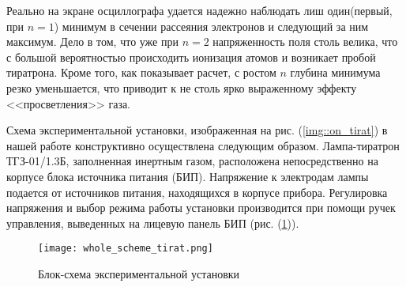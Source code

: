 Реально на экране осциллографа удается надежно наблюдать лиш один(первый, при $n
= 1$) минимум в сечении рассеяния электронов и следующий за ним максимум. Дело в
том, что уже при $n = 2$ напряженность поля столь велика, что с большой
вероятностью происходить ионизация атомов и возникает пробой тиратрона. Кроме
того, как показывает расчет, с ростом $n$ глубина минимума резко уменьшается,
что приводит к не столь ярко выраженному эффекту <<просветления>> газа.

Схема экспериментальной установки, изображенная на рис. (\ref{img::on_tirat}) в
нашей работе конструктивно осуществлена следующим образом. Лампа-тиратрон
ТГЗ-01/1.3Б, заполненная инертным газом, расположена непосредственно на корпусе
блока источника питания (БИП). Напряжение к электродам лампы подается от
источников питания, находящихся в корпусе прибора. Регулировка напряжения и
выбор режима работы установки производится при помощи ручек управления,
выведенных на лицевую панель БИП (рис. (\ref{img::whole_tirat})).

\begin{figure}[h!]
  \centering
  \texttt{[image: whole\_scheme\_tirat.png]}
  \caption{ {Блок-схема экспериментальной установки}}
  \label{img::whole_tirat}
\end{figure}
